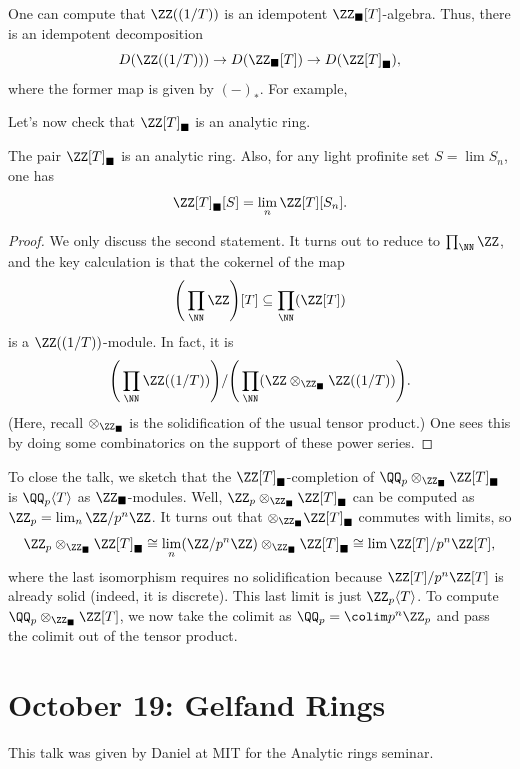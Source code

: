 \documentclass{article}
\begin{document}
\begin{remark}
	One can compute that $\ZZ((1/T))$ is an idempotent $\ZZ_\blacksquare[T]$-algebra. Thus, there is an idempotent decomposition
	\[D(\ZZ((1/T)))\to D(\ZZ_\blacksquare[T])\to D(\ZZ[T]_\blacksquare),\]
	where the former map is given by $(-)_*$. For example, 
\end{remark}
Let's now check that $\ZZ[T]_\blacksquare$ is an analytic ring.
\begin{theorem}
	The pair $\ZZ[T]_\blacksquare$ is an analytic ring. Also, for any light profinite set $S=\lim S_n$, one has
	\[\ZZ[T]_\blacksquare[S]=\lim_n\ZZ[T][S_n].\]
\end{theorem}
\begin{proof}
	We only discuss the second statement. It turns out to reduce to $\prod_\NN\ZZ$, and the key calculation is that the cokernel of the map
	\[\Bigg(\prod_\NN\ZZ\Bigg)[T]\subseteq\prod_\NN(\ZZ[T])\]
	is a $\ZZ((1/T))$-module. In fact, it is
	\[\Bigg(\prod_\NN\ZZ((1/T))\Bigg)/\Bigg(\prod_\NN(\ZZ\otimes_{\ZZ_\blacksquare}\ZZ((1/T))\Bigg).\]
	(Here, recall $\otimes_{\ZZ_\blacksquare}$ is the solidification of the usual tensor product.) One sees this by doing some combinatorics on the support of these power series.
\end{proof}
\begin{example}
	To close the talk, we sketch that the $\ZZ[T]_\blacksquare$-completion of $\QQ_p\otimes_{\ZZ_\blacksquare}\ZZ[T]_\blacksquare$ is $\QQ_p\langle T\rangle$ as $\ZZ_\blacksquare$-modules. Well, $\ZZ_p\otimes_{\ZZ_\blacksquare}\ZZ[T]_\blacksquare$ can be computed as $\ZZ_p=\lim_n\ZZ/p^n\ZZ$. It turns out that $\otimes_{\ZZ_\blacksquare}\ZZ[T]_\blacksquare$ commutes with limits, so
	\[\ZZ_p\otimes_{\ZZ_\blacksquare}\ZZ[T]_\blacksquare\cong\lim_n(\ZZ/p^n\ZZ)\otimes_{\ZZ_\blacksquare}\ZZ[T]_\blacksquare\cong\lim\ZZ[T]/p^n\ZZ[T],\]
	where the last isomorphism requires no solidification because $\ZZ[T]/p^n\ZZ[T]$ is already solid (indeed, it is discrete). This last limit is just $\ZZ_p\langle T\rangle$. To compute $\QQ_p\otimes_{\ZZ_\blacksquare}\ZZ[T]$, we now take the colimit as $\QQ_p=\colim p^n\ZZ_p$ and pass the colimit out of the tensor product.
\end{example}

\section{October 19: Gelfand Rings}
This talk was given by Daniel at MIT for the Analytic rings seminar.
\end{document}
